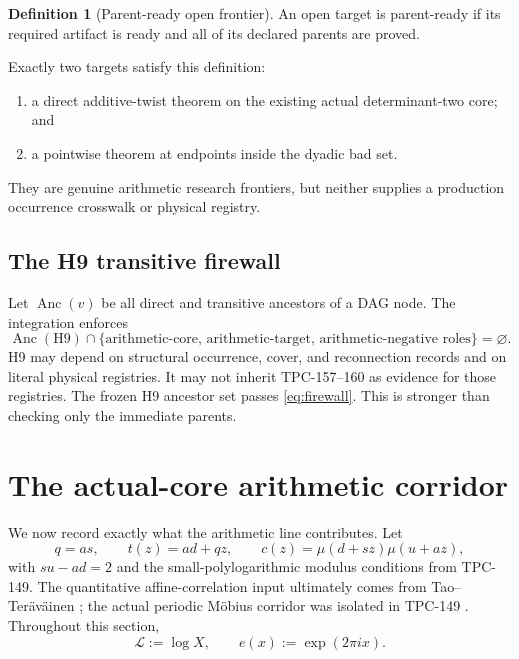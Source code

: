\documentclass[11pt]{article}
\theoremstyle{definition}
\newtheorem{definition}[theorem]{Definition}
\newcommand{\Mob}{\mu}
\newcommand{\cL}{\mathcal L}
\begin{document}
\begin{definition}[Parent-ready open frontier]
An open target is parent-ready if its required artifact is ready and
all of its declared parents are proved.
\end{definition}

Exactly two targets satisfy this definition:
\begin{enumerate}[leftmargin=2.2em]
  \item a direct additive-twist theorem on the existing actual
  determinant-two core; and
  \item a pointwise theorem at endpoints inside the dyadic bad set.
\end{enumerate}
They are genuine arithmetic research frontiers, but neither supplies
a production occurrence crosswalk or physical registry.

\subsection{The H9 transitive firewall}

Let \(\operatorname{Anc}(v)\) be all direct and transitive ancestors
of a DAG node.  The integration enforces
\begin{equation}
 \operatorname{Anc}(\mathrm{H9})
 \cap
 \{\text{arithmetic-core, arithmetic-target,
 arithmetic-negative roles}\}
 =\varnothing.                                                 \label{eq:firewall}
\end{equation}
H9 may depend on structural occurrence, cover, and reconnection
records and on literal physical registries.  It may not inherit
TPC-157--160 as evidence for those registries.  The frozen H9
ancestor set passes \eqref{eq:firewall}.  This is stronger than
checking only the immediate parents.

\section{The actual-core arithmetic corridor}

We now record exactly what the arithmetic line contributes.  Let
\[
 q=as,\qquad t(z)=ad+qz,\qquad
 c(z)=\Mob(d+sz)\Mob(u+az),
\]
with \(su-ad=2\) and the small-polylogarithmic modulus conditions from
TPC-149.  The quantitative affine-correlation input ultimately comes
from Tao--Ter\"av\"ainen \cite{TaoTeravainen2026}; the actual periodic
M\"obius corridor was isolated in TPC-149 \cite{WangTPC149}.
Throughout this section,
\[
  \cL:=\log X,\qquad e(x):=\exp(2\pi i x).
\]
\end{document}
